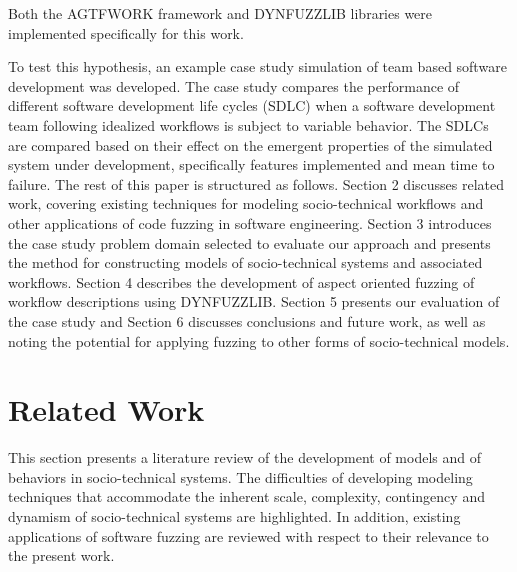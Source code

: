 \documentclass{llncs}
\begin{document}
Both the AGTFWORK framework and DYNFUZZLIB libraries were implemented specifically for this work.

To test this hypothesis, an example case study simulation of team based software development was developed.  The case
study compares the performance of different software development life cycles (SDLC) when a software development team
following idealized workflows is subject to variable behavior.  The SDLCs are compared based on their effect on the
emergent properties of the simulated system under development, specifically features implemented and mean time to
failure.  The rest of this paper is structured as follows.  Section 2 discusses related work, covering existing
techniques for modeling socio-technical workflows and other applications of code fuzzing in software engineering.
Section 3 introduces the case study problem domain selected to evaluate our approach and presents the method for
constructing models of socio-technical systems and associated workflows. Section 4 describes the development of aspect
oriented fuzzing of workflow descriptions using DYNFUZZLIB.  Section 5 presents our evaluation of the case study and
Section 6 discusses conclusions and future work, as well as noting the potential for applying fuzzing to other forms of
socio-technical models.


\section{Related Work}


This section presents a literature review of the development of models and of behaviors in socio-technical systems.  The
difficulties of developing modeling techniques that accommodate the inherent scale, complexity, contingency and dynamism
of socio-technical systems are highlighted.  In addition, existing applications of software fuzzing are reviewed with
respect to their relevance to the present work.
\end{document}

